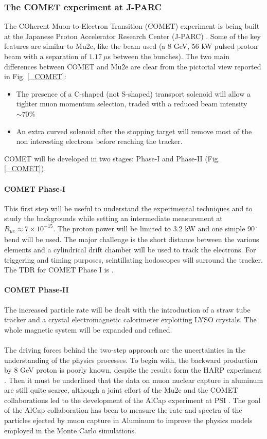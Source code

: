 \documentclass[12pt,a4paper,openright, oneside, titlepage]{book} %
\begin{document}
 


\subsubsection{The COMET experiment at J-PARC}
The COherent Muon-to-Electron Transition (COMET) experiment is being built at the Japanese Proton Accelerator Research Center (J-PARC) \cite{COMET_I}. 
Some of the key features are similar to Mu2e, 
like the beam used (a 8 GeV, 56 kW pulsed proton beam with a separation of $1.17\ \mu$s between the bunches). 
The two main differences between COMET and Mu2e are clear from the pictorial view reported in Fig. \ref{_COMET}:
\begin{itemize}
\item The presence of a C-shaped (not S-shaped) transport solenoid will allow a tighter muon momentum selection, 
traded with a reduced beam intensity $\sim 70\%$
\item An extra curved solenoid after the stopping target will remove most of the non interesting electrons 
before reaching the tracker.
\end{itemize}
COMET will be developed in two stages: Phase-I and Phase-II (Fig. \ref{_COMET}).
\paragraph{COMET Phase-I}
This first step will be useful to understand the experimental techniques and to study the backgrounds while setting an intermediate measurement at $R_{\mu e}\approx7\times10^{-15}$. 
The proton power will be limited to 3.2 kW and one simple 90$^\circ$ bend will be used. 
The major challenge is the short distance between the various elements and a cylindrical drift chamber will be used to track the electrons. For triggering and timing purposes, scintillating hodoscopes will surround the tracker. 
The TDR for COMET Phase I is \cite{COMET_I}.
\paragraph{COMET Phase-II}
The increased particle rate will be dealt with the introduction of a straw tube tracker 
and a crystal electromagnetic calorimeter exploiting LYSO crystals. 
The whole magnetic system will be expanded and refined.\\ \\
The driving forces behind the two-step approach are the uncertainties in the understanding of the physics processes. 
To begin with, the backward production by 8 GeV proton is poorly known, 
despite the results form the HARP experiment \cite{HARP}.
Then it must be underlined that the data on muon nuclear capture in aluminum are still quite scarce, 
although a joint effort of the Mu2e and the COMET collaborations led to the development of the AlCap experiment at PSI \cite{Edmonds:2015}\cite{AlCap:2015}\cite{AlCap:2018}. 
The goal of the AlCap collaboration has been to measure the rate and spectra of the particles ejected by muon capture in Aluminum to improve the physics models employed in the Monte Carlo simulations.
\end{document}
